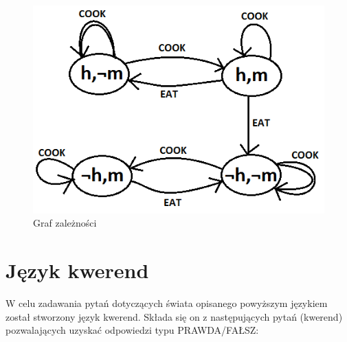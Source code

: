 \documentclass{article}
\begin{document}
\begin{figure}[h]
\centering
\includegraphics[scale=0.7]{graphJohn}
\caption{Graf zależności}
\end{figure}


\section{Język kwerend}
W celu zadawania pytań dotyczących świata opisanego powyższym językiem został stworzony język kwerend. Składa się on z następujących pytań (kwerend) pozwalających uzyskać odpowiedzi typu PRAWDA/FAŁSZ:
\end{document}
